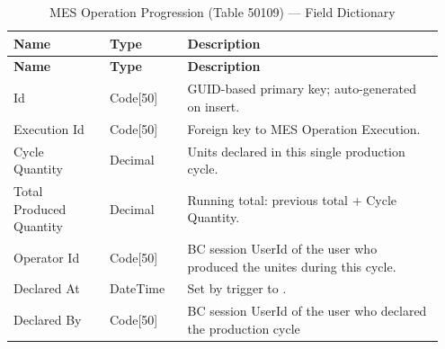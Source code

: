 \begin{longtable}{@{} P{0.21\linewidth} P{0.17\linewidth} P{0.57\linewidth} @{}}
	\caption{MES Operation Progression (Table 50109) --- Field Dictionary}
	\label{tab:s3-table-progression} \\
	\toprule
	\textbf{Name} & \textbf{Type} & \textbf{Description} \\
	\midrule
	\endfirsthead
	\toprule
	\textbf{Name} & \textbf{Type} & \textbf{Description} \\
	\midrule
	\endhead
	
	\bottomrule
	\endlastfoot
	
	Id & Code[50] & GUID-based primary key; auto-generated on insert. \\
	\midrule
	Execution Id & Code[50] & Foreign key to MES Operation Execution. \\
	\midrule
	Cycle Quantity & Decimal & Units declared in this single production cycle. \\
	\midrule
	Total Produced Quantity & Decimal & Running total: previous total + Cycle Quantity. \\
	\midrule
	Operator Id & Code[50] & BC session UserId of the user who produced the unites during this cycle. \\
	\midrule
	Declared At & DateTime & Set by  trigger to . \\
	\midrule
	Declared By & Code[50] &  BC session UserId of the user who declared the production cycle  \\
\end{longtable}


